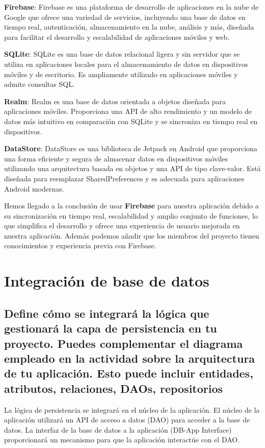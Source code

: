 \textbf{Firebase}: Firebase es una plataforma de desarrollo de aplicaciones en la nube de Google que ofrece una variedad de servicios, incluyendo una base de datos en tiempo real, autenticación, almacenamiento en la nube, análisis y más, diseñada para facilitar el desarrollo y escalabilidad de aplicaciones móviles y web.

\textbf{SQLite}: SQLite es una base de datos relacional ligera y sin servidor que se utiliza en aplicaciones locales para el almacenamiento de datos en dispositivos móviles y de escritorio. Es ampliamente utilizado en aplicaciones móviles y admite consultas SQL.

\textbf{Realm}: Realm es una base de datos orientada a objetos diseñada para aplicaciones móviles. Proporciona una API de alto rendimiento y un modelo de datos más intuitivo en comparación con SQLite y se sincroniza en tiempo real en dispositivos.

\textbf{DataStore}: DataStore es una biblioteca de Jetpack en Android que proporciona una forma eficiente y segura de almacenar datos en dispositivos móviles utilizando una arquitectura basada en objetos y una API de tipo clave-valor. Está diseñada para reemplazar SharedPreferences y es adecuada para aplicaciones Android modernas.

Hemos llegado a la conclusión de usar \textbf{Firebase} para nuestra aplicación debido a su sincronización en tiempo real, escalabilidad y amplio conjunto de funciones, lo que simplifica el desarrollo y ofrece una experiencia de usuario mejorada en nuestra aplicación. Además podemos añadir que los miembros del proyecto tienen conocimientos y experiencia previa con Firebase.


\section{Integración de base de datos}
\subsection*{Define cómo se integrará la lógica que gestionará la capa de persistencia en tu proyecto. Puedes complementar el diagrama empleado en la actividad sobre la arquitectura de tu aplicación. Esto puede incluir entidades, atributos, relaciones, DAOs, repositorios}

La lógica de persistencia se integrará en el núcleo de la aplicación. El núcleo de la aplicación utilizará un API de acceso a datos (DAO) para acceder a la base de datos. La interfaz de la base de datos a la aplicación (DB-App Interface) proporcionará un mecanismo para que la aplicación interactúe con el DAO.


